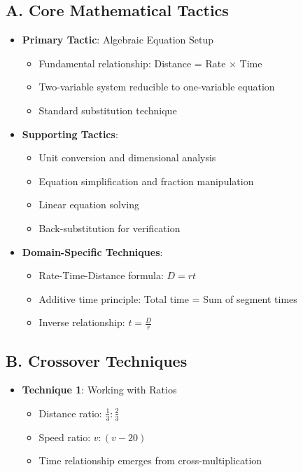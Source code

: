 \documentclass[11pt]{article}
\begin{document}
\begin{tacticalbox}
\subsection*{A. Core Mathematical Tactics}
\begin{itemize}[leftmargin=*]
    \item \textbf{Primary Tactic}: Algebraic Equation Setup
    \begin{itemize}[leftmargin=*]
        \item Fundamental relationship: Distance = Rate × Time
        \item Two-variable system reducible to one-variable equation
        \item Standard substitution technique
    \end{itemize}
    
    \item \textbf{Supporting Tactics}:
    \begin{itemize}[leftmargin=*]
        \item Unit conversion and dimensional analysis
        \item Equation simplification and fraction manipulation
        \item Linear equation solving
        \item Back-substitution for verification
    \end{itemize}
    
    \item \textbf{Domain-Specific Techniques}:
    \begin{itemize}[leftmargin=*]
        \item Rate-Time-Distance formula: $D = rt$
        \item Additive time principle: Total time = Sum of segment times
        \item Inverse relationship: $t = \frac{D}{r}$
    \end{itemize}
\end{itemize}

\subsection*{B. Crossover Techniques}
\begin{itemize}[leftmargin=*]
    \item \textbf{Technique 1}: Working with Ratios
    \begin{itemize}[leftmargin=*]
        \item Distance ratio: $\frac{1}{3} : \frac{2}{3}$
        \item Speed ratio: $v : (v-20)$
        \item Time relationship emerges from cross-multiplication
    \end{itemize}
    

\end{itemize}
\end{tacticalbox}
\end{document}
